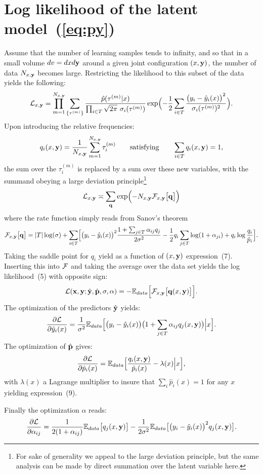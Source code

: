 \chapter{Log likelihood of the latent model~(\ref{eq:py})}\label{app:LL}
Assume that the number of learning samples tends to infinity, and so that in a small volume $dv = dxd{\bf y}$ around a given  joint configuration $(x,{\bf y})$,
the number of data $N_{x,{\bf y}}$ becomes large. Restricting the likelihood to this subset of the data yields the following:
\[
{\cal L}_{x,{\bf y}} = \prod_{m=1}^{N_{x,{\bf y}}} \sum_{\{\tau^{(m)}\}} 
\frac{\hat p(\tau^{(m)}\vert x)}{\prod_{i\in T}\sqrt{2\pi}\ \sigma_i(\tau^{(m)})}
\exp\Bigl(-\frac{1}{2}\sum_{i\in T}\frac{\bigl(y_i-\hat y_i(x)\bigr)^2}{\sigma_i(\tau^{(m)})^2}\Bigr).
\]
Upon introducing the relative frequencies:
\[
q_i(x,{\bf y}) = \frac{1}{N_{x,{\bf y}}}\sum_{m=1}^{N_{x,{\bf y}}} \tau_i^{(m)} 
\qquad\text{satisfying}\qquad 
\sum_{i\in T} q_i(x,{\bf y}) = 1,
\]
the sum over the $\tau_i^{(m)}$ is replaced by a sum over these new variables, with the summand obeying a large deviation principle\footnote{For sake of generality we appeal to the large deviation principle, but the same analysis can be made by direct summation over the latent variable here.} 
\[
{\cal L}_{x,{\bf y}} \asymp \sum_{{\bf q}} 
\exp\Bigl(-N_{x,{\bf y}} {\cal F}_{x,{\bf y}}\bigl[{\bf q}\bigr]\Bigr)
\]
where the rate function simply reads from Sanov's theorem
\[
{\cal F}_{x,{\bf y}}\bigl[{\bf q}\bigr] = \vert T\vert\log(\sigma)+
\sum_{i\in T}\Bigl[\bigl(y_i-\hat y_i(x)\bigr)^2\frac{1+\sum_{j\in T}\alpha_{ij}q_j}{2\sigma^2}
-\frac{1}{2}q_i\sum_{j\in T}\log(1+\alpha_{ji})+q_i\log\frac{q_i}{\hat p_i}\Bigr].
\]
Taking the saddle point for $q_i$ yield as a function of $(x,{\bf y})$ %
expression~(7). Inserting this into ${\cal F}$ and taking
the average over the data set yields the log likelihood~(5) with 
opposite sign:
\[
{\cal L}({\bf x},{\bf y};\hat {\bf y},\hat{\bf p},\sigma,\alpha) = -{\mathbb E}_{data}\Bigl[{\cal F}_{x,{\bf y}}\bigl[{\bf q}(x,{\bf y})\bigr]\Bigr].
\]
The optimization of the predictors $\hat {\bf y}$ yields:
\[
\frac{\partial{\cal L}}{\partial \hat y_i(x)} = \frac{1}{\sigma^2}{\mathbb E}_{data}\Bigl[ \bigl(y_i-\hat y_i(x)\bigr)\bigl(1+\sum_{j\in T}\alpha_{ij}q_j(x,{\bf y})\bigr)\Big\vert x\Bigr].
\]
The optimization of $\hat{\bf p}$ gives:
\[
\frac{\partial{\cal L}}{\partial \hat p_i(x)} = {\mathbb E}_{data}\Bigl[\frac{q_i(x,{\bf y})}{\hat p_i(x)}-\lambda(x)\Big\vert x \Bigr],
\]
with $\lambda(x)$ a Lagrange multiplier to insure that $\sum_i\hat p_i(x)=1$ 
for any $x$ yielding expression~(9).

Finally the optimization $\alpha$ reads:
\[
\frac{\partial{\cal L}}{\partial \alpha_{ij}} = \frac{1}{2(1+\alpha_{ij})}{\mathbb E}_{data}\bigl[q_j(x,{\bf y})\bigr]-\frac{1}{2\sigma^2}
{\mathbb E}_{data}\bigl[\bigl(y_i-\hat y_i(x)\bigr)^2q_j(x,{\bf y})\bigr].
\]
